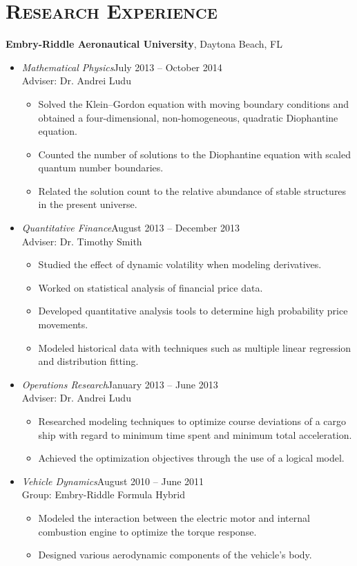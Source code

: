 \documentclass[10pt]{article}
\begin{document}
\section*{\textsc{Research Experience}}
\textbf{Embry-Riddle Aeronautical University}, Daytona Beach, FL
\begin{itemize}[noitemsep]
    \item[] \textit{Mathematical Physics}\hfill July 2013 -- October 2014\\Adviser: Dr. Andrei Ludu
    \begin{itemize}[noitemsep]
        \item Solved the Klein--Gordon equation with moving boundary conditions and obtained a four-dimensional, non-homogeneous, quadratic Diophantine equation.
        \item Counted the number of solutions to the Diophantine equation with scaled quantum number boundaries.
        \item Related the solution count to the relative abundance of stable structures in the present universe.
    \end{itemize}
    \item[] \textit{Quantitative Finance}\hfill August 2013 -- December 2013\\Adviser: Dr. Timothy Smith
    \begin{itemize}[noitemsep]
        \item Studied the effect of dynamic volatility when modeling derivatives.
        \item Worked on statistical analysis of financial price data.
        \item Developed quantitative analysis tools to determine high probability price movements.
        \item Modeled historical data with techniques such as multiple linear regression and distribution fitting.
    \end{itemize}
    \item[] \textit{Operations Research}\hfill January 2013 -- June 2013\\Adviser: Dr. Andrei Ludu
    \begin{itemize}[noitemsep]
        \item Researched modeling techniques to optimize course deviations of a cargo ship with regard to minimum time spent and minimum total acceleration.
        \item Achieved the optimization objectives through the use of a logical model.
    \end{itemize}
    \item[] \textit{Vehicle Dynamics}\hfill August 2010 -- June 2011\\Group: Embry-Riddle Formula Hybrid
    \begin{itemize}[noitemsep]
        \item Modeled the interaction between the electric motor and internal combustion engine to optimize the torque response.
        \item Designed various aerodynamic components of the vehicle's body.
    \end{itemize}
\end{itemize}
\end{document}
